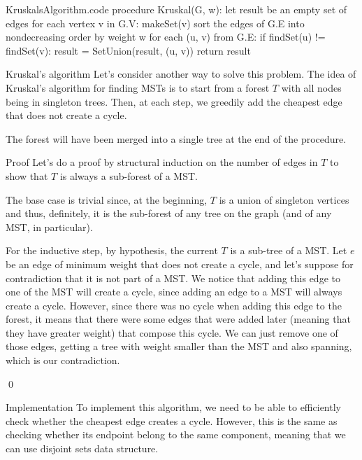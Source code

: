 \documentclass[a4paper]{article}
\begin{document}
\begin{filecontents*}[overwrite]{KruskalsAlgorithm.code}
procedure Kruskal(G, w):
    let result be an empty set of edges
    for each vertex v in G.V:
        makeSet(v)
    sort the edges of G.E into nondecreasing order by weight w
    for each (u, v) from G.E:
        if findSet(u) != findSet(v):
            result = SetUnion(result, (u, v))
    return result
\end{filecontents*}

\begin{parag}{Kruskal's algorithm}
    Let's consider another way to solve this problem. The idea of Kruskal's algorithm for finding MSTs is to start from a forest $T$ with all nodes being in singleton trees. Then, at each step, we greedily add the cheapest edge that does not create a cycle.

    The forest will have been merged into a single tree at the end of the procedure.

    \begin{subparag}{Proof}
        Let's do a proof by structural induction on the number of edges in $T$ to show that $T$ is always a sub-forest of a MST.

        The base case is trivial since, at the beginning, $T$ is a union of singleton vertices and thus, definitely, it is the sub-forest of any tree on the graph (and of any MST, in particular). 

        For the inductive step, by hypothesis, the current $T$ is a sub-tree of a MST. Let $e$ be an edge of minimum weight that does not create a cycle, and let's suppose for contradiction that it is not part of a MST. We notice that adding this edge to one of the MST will create a cycle, since adding an edge to a MST will always create a cycle. However, since there was no cycle when adding this edge to the forest, it means that there were some edges that were added later (meaning that they have greater weight) that compose this cycle. We can just remove one of those edges, getting a tree with weight smaller than the MST and also spanning, which is our contradiction.

        \qed
    \end{subparag}
    
    \begin{subparag}{Implementation}
        To implement this algorithm, we need to be able to efficiently check whether the cheapest edge creates a cycle. However, this is the same as checking whether its endpoint belong to the same component, meaning that we can use disjoint sets data structure. 


\end{subparag}
\end{parag}
\end{document}
